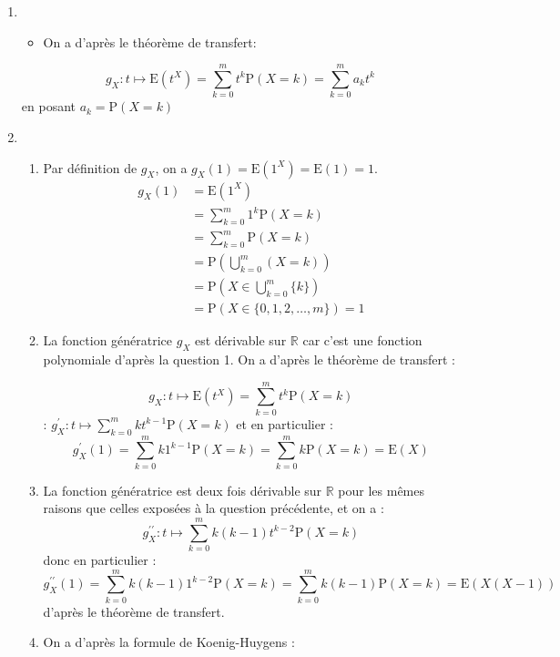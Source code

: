 \documentclass[a4paper, 11pt,reqno]{article}
\begin{document}
\begin{correction}

\begin{enumerate}
\item 
\begin{itemize}
  \item On a d'après le théorème de transfert:
\end{itemize}
$$
g_{X}: t \mapsto \mathrm{E}\left(t^{X}\right)=\sum_{k=0}^{m} t^{k} \mathrm{P}(X=k)=\sum_{k=0}^{m} a_{k} t^{k} 
$$
 en posant  $a_{k}=\mathrm{P}(X=k)$

\item \begin{enumerate}

  \item Par définition de $g_{X}$, on a $g_{X}(1)=\mathrm{E}\left(1^{X}\right)=\mathrm{E}(1)=1$.
  \begin{align*}
g_{X}(1)&=\mathrm{E}\left(1^{X}\right)\\
&=\sum_{k=0}^{m} 1^{k} \mathrm{P}(X=k)\\
&=\sum_{k=0}^{m} \mathrm{P}(X=k)\\
&=\mathrm{P}\left(\bigcup_{k=0}^{m}(X=k)\right)\\
&=\mathrm{P}\left(X \in \bigcup_{k=0}^{m}\{k\}\right)\\
&=\mathrm{P}(X \in\{0,1,2, \ldots, m\})=1
  \end{align*}

\item 
 La fonction génératrice $g_{X}$ est dérivable sur $\mathbb{R}$ car c'est une fonction polynomiale d'après la question 1. On a d'après le théorème de transfert :

$$
g_{X}: t \mapsto \mathrm{E}\left(t^{X}\right)=\sum_{k=0}^{m} t^{k} \mathrm{P}(X=k) $$
: $ g_{X}^{\prime}: t \mapsto \sum_{k=0}^{m} k t^{k-1} \mathrm{P}(X=k)
$
et en particulier :
$$
g_{X}^{\prime}(1)=\sum_{k=0}^{m} k 1^{k-1} \mathrm{P}(X=k)=\sum_{k=0}^{m} k \mathrm{P}(X=k)=\mathrm{E}(X)
$$


\item  La fonction génératrice est deux fois dérivable sur $\mathbb{R}$ pour les mêmes raisons que celles exposées à la question précédente, et on a :
$$
g_{X}^{\prime \prime}: t \mapsto \sum_{k=0}^{m} k(k-1) t^{k-2} \mathrm{P}(X=k)
$$
donc en particulier :
$$
g_{X}^{\prime \prime}(1)=\sum_{k=0}^{m} k(k-1) 1^{k-2} \mathrm{P}(X=k)=\sum_{k=0}^{m} k(k-1) \mathrm{P}(X=k)=\mathrm{E}(X(X-1))
$$
d'après le théorème de transfert.
\item  On a d'après la formule de Koenig-Huygens :


\end{enumerate}
\end{enumerate}
\end{correction}
\end{document}
